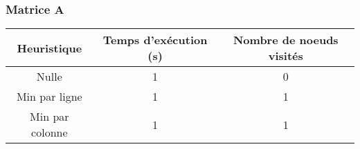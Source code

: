 \documentclass[11pt]{article} %
\begin{document}
\subsubsection{Matrice A}

\begin{center}
    \begin{tabular}{|c|c|c|}
        \hline
        \textbf{Heuristique} & \textbf{Temps d'exécution (s)} & \textbf{Nombre de noeuds visités} \\ \hline
        Nulle &   1   &  0   \\ \hline
        Min par ligne &   1   &  1   \\ \hline
        Min par colonne &   1   &  1   \\ \hline
    \end{tabular}
\end{center}
\end{document}
